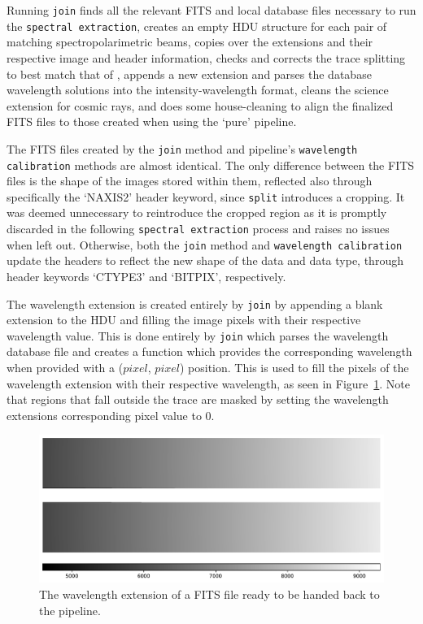 Running \texttt{join} finds all the relevant \gls{FITS} and local database files necessary to run the \polsalt \texttt{spectral extraction}, creates an empty \gls{HDU} structure for each pair of matching spectropolarimetric beams, copies over the extensions and their respective image and header information, checks and corrects the trace splitting to best match that of \polsalt, appends a new extension and parses the database wavelength solutions into the \polsalt intensity-wavelength format, cleans the science extension for cosmic rays, and does some house-cleaning to align the finalized \gls{FITS} files to those created when using the `pure' \polsalt pipeline.
\prgph

The \gls{FITS} files created by the \texttt{join} method and \polsalt pipeline's \texttt{wavelength calibration} methods are almost identical. The only difference between the \gls{FITS} files is the shape of the images stored within them, reflected also through specifically the `NAXIS2' header keyword, since \texttt{split} introduces a cropping. It was deemed unnecessary to reintroduce the cropped region as it is promptly discarded in the following \polsalt \texttt{spectral extraction} process and raises no issues when left out. Otherwise, both the \texttt{join} method and \polsalt \texttt{wavelength calibration} update the headers to reflect the new shape of the data and data type, through header keywords `CTYPE3' and `BITPIX', respectively.
\prgph

The wavelength extension is created entirely by \texttt{join} by appending a blank extension to the \gls{HDU} and filling the image pixels with their respective wavelength value. This is done entirely by \texttt{join} which parses the wavelength database file and creates a function which provides the corresponding wavelength when provided with a ($pixel$, $pixel$) position. This is used to fill the pixels of the wavelength extension with their respective wavelength, as seen in Figure~\ref{fig:pol_wav_ext}. Note that regions that fall outside the trace are masked by setting the wavelength extensions corresponding pixel value to $0$.
\prgph

\begin{figure}[t]
    \centering
    \includegraphics[width = 1.0\textwidth]{figures/3_pol_wav_ext.pdf}
    \caption{The wavelength extension of a \gls{FITS} file ready to be handed back to the \polsalt pipeline.}
    \label{fig:pol_wav_ext}
\end{figure}

